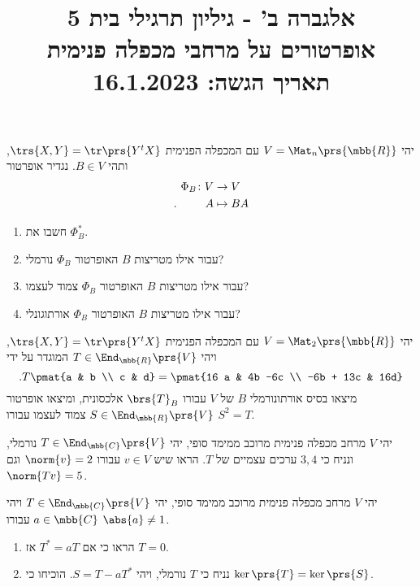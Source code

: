 \documentclass[a4paper,10pt,twoside,openany]{article}
\title{
אלגברה ב' - גיליון תרגילי בית 5 \\
אופרטורים על מרחבי מכפלה פנימית
\\
\vspace{1cm}
\large{תאריך הגשה: 16.1.2023}
}
\date{}
\begin{document}
\maketitle

\begin{exercise}
יהי
$V = \Mat_n\prs{\mbb{R}}$
עם המכפלה הפנימית
$\trs{X,Y} = \tr\prs{Y^t X}$,
ותהי
$B \in V$.
נגדיר אופרטור
\begin{align*}
\Phi_B \colon V &\to V \\
\text{.} \hphantom{lalala} A &\mapsto BA
\end{align*}
\begin{enumerate}
\item
חשבו את
$\Phi_B^*$.
\item
עבור אילו מטריצות
$B$
האופרטור
$\Phi_B$
נורמלי?
\item
עבור אילו מטריצות
$B$
האופרטור
$\Phi_B$
צמוד לעצמו?
\item
עבור אילו מטריצות
$B$
האופרטור
$\Phi_B$
אורתוגונלי?
\end{enumerate}
\end{exercise}

\begin{exercise}
יהי
$V = \Mat_2\prs{\mbb{R}}$
עם המכפלה הפנימית
$\trs{X,Y} = \tr\prs{Y^t X}$,
ויהי
$T \in \End_{\mbb{R}}\prs{V}$
המוגדר על ידי
\[\text{.} T\pmat{a & b \\ c & d} = \pmat{16 a & 4b -6c \\ -6b + 13c & 16d}\]
מיצאו בסיס אורתונורמלי
$B$
של
$V$
עבורו
$\brs{T}_B$
אלכסונית, ומיצאו אופרטור
$S \in \End_{\mbb{R}}\prs{V}$
צמוד לעצמו עבורו
$S^2 = T$.
\end{exercise}

\begin{exercise}
יהי
$V$
מרחב מכפלה פנימית מרוכב ממימד סופי, יהי
$T \in \End_{\mbb{C}}\prs{V}$
נורמלי, ונניח כי
$3,4$
ערכים עצמיים של
$T$.
הראו שיש
$v \in V$
עבורו
$\norm{v} = 2$
וגם
$\norm{Tv} = 5$.
\end{exercise}

\begin{exercise}
יהי
$V$
מרחב מכפלה פנימית מרוכב ממימד סופי, יהי
$T \in \End_{\mbb{C}}\prs{V}$
ויהי
$a \in \mbb{C}$
עבורו
$\abs{a} \neq 1$.

\begin{enumerate}
\item הראו כי אם
$T^* = aT$
אז
$T = 0$.

\item נניח כי
$T$
נורמלי, ויהי
$S = T - a T^*$.
הוכיחו כי
$\ker\prs{T} = \ker\prs{S}$.
\end{enumerate}
\end{exercise}
\end{document}
